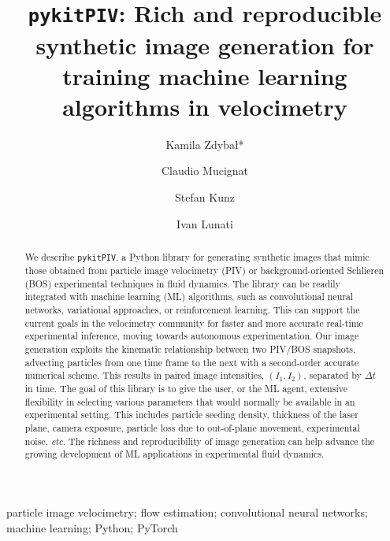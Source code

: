\documentclass[a4paper,fleqn]{cas-dc}
\begin{document}


\title [mode = title]{\texttt{pykitPIV}: Rich and reproducible synthetic image generation for training machine learning algorithms in velocimetry}

\author[EMPA]{Kamila Zdyba\l{}*}

\author[EMPA]{Claudio Mucignat}
\author[EMPA]{Stefan Kunz}
\author[EMPA]{Ivan Lunati}

\address[EMPA]{Laboratory for Computational Engineering, Swiss Federal Laboratories for Materials Science and Technology, Empa, Dübendorf, Switzerland}

\begin{abstract}
We describe \texttt{pykitPIV}, a Python library for generating synthetic images that mimic those obtained from particle image velocimetry (PIV) or background-oriented Schlieren (BOS) experimental techniques in fluid dynamics. The library can be readily integrated with machine learning (ML) algorithms, such as convolutional neural networks, variational approaches, or reinforcement learning. This can support the current goals in the velocimetry community for faster and more accurate real-time experimental inference, moving towards autonomous experimentation. Our image generation exploits the kinematic relationship between two PIV/BOS snapshots, advecting particles from one time frame to the next with a second-order accurate numerical scheme. This results in paired image intensities, $(I_1, I_2)$, separated by $\Delta t$ in time. The goal of this library is to give the user, or the ML agent, extensive flexibility in selecting various parameters that would normally be available in an experimental setting. This includes particle seeding density, thickness of the laser plane, camera exposure, particle loss due to out-of-plane movement, experimental noise, \textit{etc}. The richness and reproducibility of image generation can help advance the growing development of ML applications in experimental fluid dynamics.
\end{abstract}

\begin{keywords}
particle image velocimetry; flow estimation; convolutional neural networks; machine learning; Python; PyTorch
\end{keywords}

\maketitle
\end{document}
